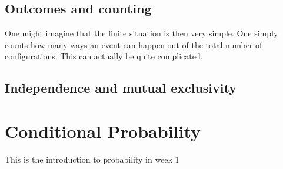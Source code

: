 \documentclass[
]{book}
\theoremstyle{definition}
\theoremstyle{definition}
\theoremstyle{definition}
\theoremstyle{definition}
\theoremstyle{remark}
\begin{document}
\hypertarget{outcomes-and-counting}{%
\section{Outcomes and counting}\label{outcomes-and-counting}}

One might imagine that the finite situation is then very simple. One simply counts how many ways an event can happen out of the total number of configurations. This can actually be quite complicated.

\hypertarget{independence-and-mutual-exclusivity}{%
\section{Independence and mutual exclusivity}\label{independence-and-mutual-exclusivity}}

\hypertarget{cond}{%
\chapter{Conditional Probability}\label{cond}}

This is the introduction to probability in week 1

  
\end{document}
